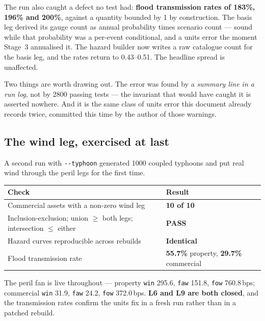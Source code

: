 \documentclass[11pt]{article}
\begin{document}
\noindent The run also caught a defect no test had: \textbf{flood transmission
rates of 183\%, 196\% and 200\%}, against a quantity bounded by 1 by
construction. The basis leg derived its gauge count as annual probability times
scenario count --- sound while that probability was a per-event conditional, and
a units error the moment Stage~3 annualised it. The hazard builder now writes a
raw catalogue count for the basis leg, and the rates return to 0.43--0.51. The
headline spread is unaffected.

Two things are worth drawing out. The error was found by a \emph{summary line in
a run log}, not by 2800 passing tests --- the invariant that would have caught
it is asserted nowhere. And it is the same class of units error this document
already records twice, committed this time by the author of those warnings.

\subsection{The wind leg, exercised at last}

A second run with \texttt{-{}-typhoon} generated 1000 coupled typhoons and put
real wind through the peril legs for the first time.

\begin{center}
\begin{tabular}{@{}lp{}@{}}
\toprule
\textbf{Check} & \textbf{Result} \\
\midrule
Commercial assets with a non-zero wind leg & \textbf{10 of 10} \\
Inclusion-exclusion; union $\geq$ both legs; intersection $\leq$ either & \textbf{PASS} \\
Hazard curves reproducible across rebuilds & \textbf{Identical} \\
Flood transmission rate & \textbf{55.7\%} property, \textbf{29.7\%} commercial \\
\bottomrule
\end{tabular}
\end{center}

\noindent The peril fan is live throughout --- property \texttt{win} 295.6,
\texttt{faw} 151.8, \texttt{fow} 760.8\,bps; commercial \texttt{win} 31.9,
\texttt{faw} 24.2, \texttt{fow} 372.0\,bps. \textbf{L6 and L9 are both closed},
and the transmission rates confirm the units fix in a fresh run rather than in a
patched rebuild.
\end{document}
